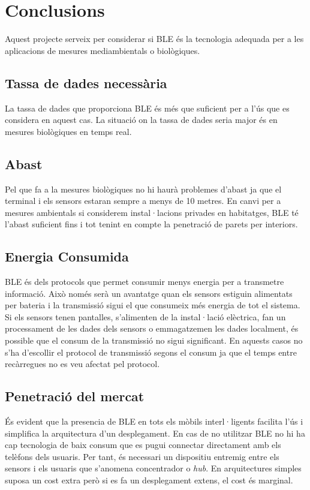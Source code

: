 \cleardoublepage
{}
\chapter*{Conclusions}

Aquest projecte serveix per considerar si BLE és la tecnologia adequada per a les aplicacions de mesures mediambientals o biològiques.

\section{Tassa de dades necessària}

La tassa de dades que proporciona BLE és més que suficient per a l'ús que es considera en aquest cas.
La situació on la tassa de dades seria major és en mesures biològiques en temps real.

\section{Abast}

Pel que fa a la mesures biològiques no hi haurà problemes d'abast ja que el terminal i els sensors estaran sempre a menys de 10 metres.
En canvi per a mesures ambientals si considerem instal·lacions privades en habitatges, BLE té l'abast suficient fins i tot tenint en compte la penetració de parets per interiors.

\section{Energia Consumida}

BLE és dels protocols que permet consumir menys energia per a transmetre informació.
Això només serà un avantatge quan els sensors estiguin alimentats per bateria i la transmissió sigui el que consumeix més energia de tot el sistema.
Si els sensors tenen pantalles, s'alimenten de la instal·lació elèctrica, fan un processament de les dades dels sensors o emmagatzemen les dades localment, és possible que el consum de la transmissió no sigui significant.
En aquests casos no s'ha d'escollir el protocol de transmissió segons el consum ja que el temps entre recàrregues no es veu afectat pel protocol.


\section{Penetració del mercat}

És evident que la presencia de BLE en tots els mòbils interl·ligents facilita l'ús i simplifica la arquitectura d'un desplegament.
En cas de no utilitzar BLE no hi ha cap tecnologia de baix consum que es pugui connectar directament amb els telèfons dels usuaris.
Per tant, és necessari un dispositiu entremig entre els sensors i els usuaris que s'anomena concentrador o \textit{hub}.
En arquitectures simples suposa un cost extra però si es fa un desplegament extens, el cost és marginal.


